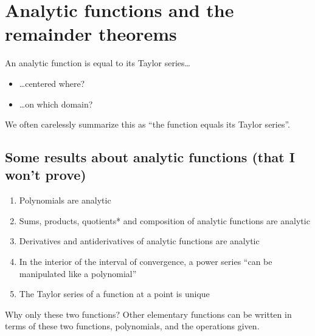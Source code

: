 \newpage
\section{Analytic functions and the remainder theorems}
An analytic function is equal to its Taylor series\dots \begin{itemize}
    \item \dots centered where?
    \item \dots on which domain?
\end{itemize}

We often carelessly summarize this as ``the function equals its Taylor series''. \\
\subsection*{Some results about analytic functions (that I won't prove)} \begin{enumerate}
    \item Polynomials are analytic
    \item Sums, products, quotients* and composition of analytic functions are analytic
    \item Derivatives and antiderivatives of analytic functions are analytic
    \item In the interior of the interval of convergence, a power series ``can be manipulated like a polynomial''
    \item The Taylor series of a function at a point is unique
\end{enumerate}
Why only these two functions? Other elementary functions can be written in terms of these two functions, polynomials, and the operations given.
